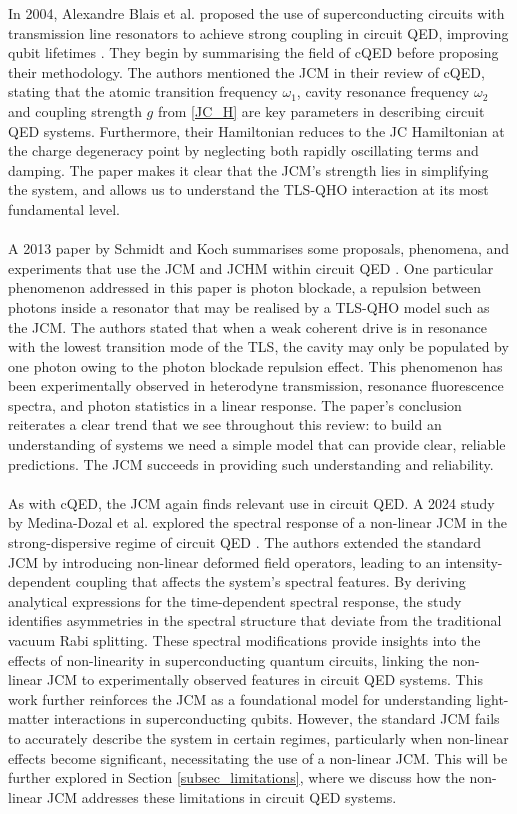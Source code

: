\documentclass[12pt,a4paper]{article}
\begin{document}
In 2004, Alexandre Blais et al. proposed the use of superconducting circuits with transmission line resonators to achieve strong coupling in circuit QED, improving qubit lifetimes \cite{Context2004-CQED_JCM}. They begin by summarising the field of cQED before proposing their methodology. The authors mentioned the JCM in their review of cQED, stating that the atomic transition frequency $\omega_1$, cavity resonance frequency $\omega_2$ and coupling strength $g$ from \eqref{JC_H} are key parameters in describing circuit QED systems. Furthermore, their Hamiltonian reduces to the JC Hamiltonian at the charge degeneracy point by neglecting both rapidly oscillating terms and damping. The paper makes it clear that the JCM's strength lies in simplifying the system, and allows us to understand the TLS-QHO interaction at its most fundamental level. \\
\\
A 2013 paper by Schmidt and Koch summarises some proposals, phenomena, and experiments that use the JCM and JCHM within circuit QED \cite{Context2013-CircuitQED}. One particular phenomenon addressed in this paper is photon blockade, a repulsion between photons inside a resonator that may be realised by a TLS-QHO model such as the JCM. The authors stated that when a weak coherent drive is in resonance with the lowest transition mode of the TLS, the cavity may only be populated by one photon owing to the photon blockade repulsion effect. This phenomenon has been experimentally observed in heterodyne transmission, resonance fluorescence spectra, and photon statistics in a linear response. The paper's conclusion reiterates a clear trend that we see throughout this review: to build an understanding of systems we need a simple model that can provide clear, reliable predictions. The JCM succeeds in providing such understanding and reliability.\\
\\
As with cQED, the JCM again finds relevant use in circuit QED. A 2024 study by Medina-Dozal et al. explored the spectral response of a non-linear JCM in the strong-dispersive regime of circuit QED \cite{Context2024-CircuitQED}. The authors extended the standard JCM by introducing non-linear deformed field operators, leading to an intensity-dependent coupling that affects the system’s spectral features. By deriving analytical expressions for the time-dependent spectral response, the study identifies asymmetries in the spectral structure that deviate from the traditional vacuum Rabi splitting. These spectral modifications provide insights into the effects of non-linearity in superconducting quantum circuits, linking the non-linear JCM to experimentally observed features in circuit QED systems. This work further reinforces the JCM as a foundational model for understanding light-matter interactions in superconducting qubits. However, the standard JCM fails to accurately describe the system in certain regimes, particularly when non-linear effects become significant, necessitating the use of a non-linear JCM. This will be further explored in Section \ref{subsec_limitations}, where we discuss how the non-linear JCM addresses these limitations in circuit QED systems.
\end{document}
